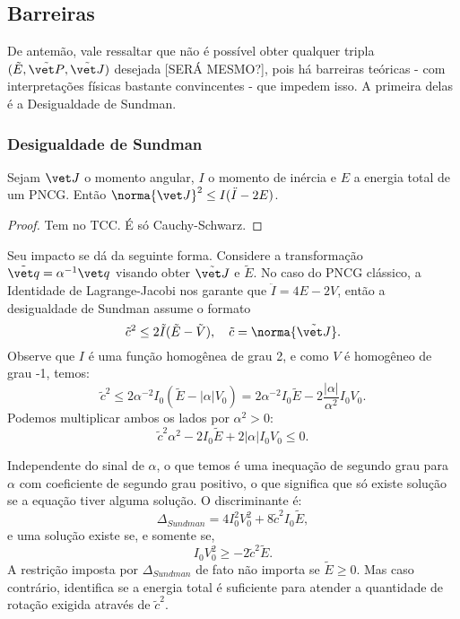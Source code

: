 \subsection{Barreiras}
De antemão, vale ressaltar que não é possível obter qualquer tripla $(\tilde E, \tilde{\vet P}, \tilde{\vet J})$ desejada [SERÁ MESMO?], pois há barreiras teóricas - com interpretações físicas bastante convincentes - que impedem isso. A primeira delas é a Desigualdade de Sundman.

\subsubsection{Desigualdade de Sundman}

\begin{theorem}
    Sejam $\vet J$ o momento angular, $I$ o momento de inércia e $E$ a energia total de um PNCG. Então $\norma{\vet J}^2 \leq I(\ddot I - 2E)$.
\end{theorem}
\begin{proof}
    Tem no TCC. É só Cauchy-Schwarz.
\end{proof}

Seu impacto se dá da seguinte forma. Considere a transformação $\tilde{\vet q} = \alpha^{-1} \vet q$ visando obter $\tilde{\vet J}$ e $\tilde E$. No caso do PNCG clássico, a Identidade de Lagrange-Jacobi nos garante que $\ddot I = 4E - 2V$, então a desigualdade de Sundman assume o formato
\begin{equation}
    \tilde c^2 \leq 2 \tilde{I} (\tilde{E} - \tilde V),
    \quad
    \tilde c = \norma{\tilde{\vet J}}.
\end{equation}
Observe que $I$ é uma função homogênea de grau 2, e como $V$ é homogêneo de grau -1, temos:
\begin{equation}
    \tilde c^2 \leq 2 \alpha^{-2} I_0 (\tilde E - |\alpha| V_0) = 2 \alpha^{-2} I_0 \tilde E - 2 \dfrac{|\alpha|}{\alpha^2} I_0 V_0.
\end{equation}
Podemos multiplicar ambos os lados por $\alpha^2 > 0$:
\begin{equation}\label{eq:inequacao_sundman}
    \tilde c^2 \alpha^2 - 2 I_0 \tilde E + 2 |\alpha| I_0 V_0 \leq 0.
\end{equation}

Independente do sinal de $\alpha$, o que temos é uma inequação de segundo grau para $\alpha$ com coeficiente de segundo grau positivo, o que significa que só existe solução se a equação tiver alguma solução. O discriminante é:
\begin{equation}\label{eq:delta_sundman}
    \Delta_{Sundman} = 4 I_0^2 V_0^2 + 8 \tilde c^2 I_0 \tilde E,
\end{equation}
e uma solução existe se, e somente se,
\begin{equation}
    I_0 V_0^2 \geq -2 \tilde c^2 \tilde E.
\end{equation}
A restrição imposta por $\Delta_{Sundman}$ de fato não importa se $\tilde E \geq 0$. Mas caso contrário, identifica se a energia total é suficiente para atender a quantidade de rotação exigida através de $\tilde c^2$.